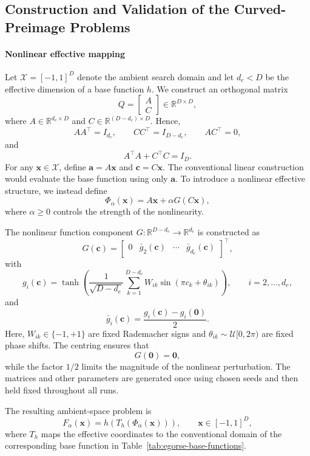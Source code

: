 \documentclass[pdflatex,sn-mathphys-num]{sn-jnl}%
\theoremstyle{thmstyleone}%
\theoremstyle{thmstyletwo}%
\theoremstyle{thmstylethree}%
\begin{document}
\begin{appendices}
\section{Construction and Validation of the Curved-Preimage Problems}
\label{app:curved-preimage-construction}

\paragraph{Nonlinear effective mapping}

Let $\mathcal{X}=[-1,1]^D$ denote the ambient search domain and let $d_e<D$ be the effective dimension of a base function $h$. We construct an orthogonal matrix
\[
Q=
\begin{bmatrix}
A\\
C
\end{bmatrix}
\in\mathbb{R}^{D\times D},
\]
where $A\in\mathbb{R}^{d_e\times D}$ and $C\in\mathbb{R}^{(D-d_e)\times D}$. Hence,
\[
AA^\top=I_{d_e},\qquad
CC^\top=I_{D-d_e},\qquad
AC^\top=0,
\]
and
\[
A^\top A+C^\top C=I_D.
\]
For any $\mathbf{x}\in\mathcal{X}$, define $\mathbf{a}=A\mathbf{x}$ and $\mathbf{c}=C\mathbf{x}$. The conventional
linear construction would evaluate the base function using only $\mathbf{a}$. To introduce a nonlinear effective structure, we instead define
\[
\Phi_{\alpha}(\mathbf{x})
=
A\mathbf{x}+\alpha G(C\mathbf{x}),
\]
where $\alpha\geq 0$ controls the strength of the nonlinearity.

The nonlinear function component $G:\mathbb{R}^{D-d_e}\rightarrow\mathbb{R}^{d_e}$ is constructed as
\[
G(\mathbf{c})
=
\begin{bmatrix}
0 &
\bar g_2(\mathbf{c}) &
\cdots &
\bar g_{d_e}(\mathbf{c})
\end{bmatrix}^{\top},
\]
with
\[
g_i(\mathbf{c})
=
\tanh\left(
\frac{1}{\sqrt{D-d_e}}
\sum_{k=1}^{D-d_e}
W_{ik}\sin(\pi c_k+\theta_{ik})
\right),
\qquad i=2,\ldots,d_e,
\]
and
\[
\bar g_i(\mathbf{c})
=
\frac{g_i(\mathbf{c})-g_i(\mathbf{0})}{2}.
\]
Here, $W_{ik}\in\{-1,+1\}$ are fixed Rademacher signs and $\theta_{ik}\sim\mathcal{U}[0,2\pi)$ are fixed phase shifts. The centring ensures that
\[
G(\mathbf{0})=\mathbf{0},
\]
while the factor $1/2$ limits the magnitude of the nonlinear perturbation. The matrices and other parameters are generated once using chosen seeds and then held fixed throughout all runs.

The resulting ambient-space problem is
\[
F_{\alpha}(\mathbf{x})
=
h\!\left(T_h\!\left(\Phi_{\alpha}(\mathbf{x})\right)\right),
\qquad \mathbf{x}\in[-1,1]^D,
\]
where $T_h$ maps the effective coordinates to the conventional domain of the corresponding base function in Table~\ref{tab:egorse-base-functions}. 


\end{appendices}
\end{document}
